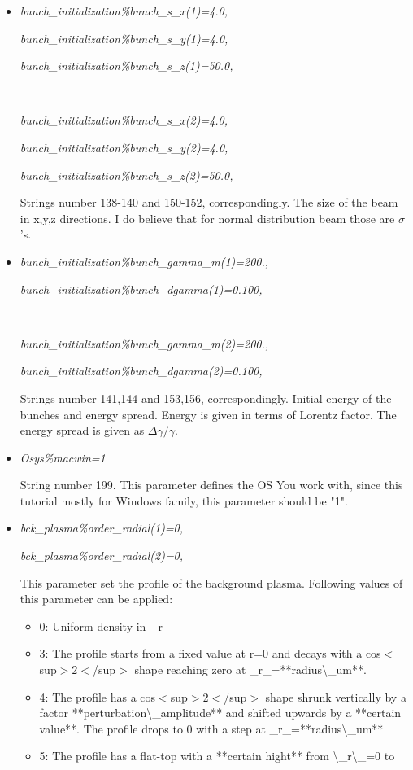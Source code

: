 \documentclass[12pt,a4paper]{article}
\begin{document}
\begin{itemize}
\item{\textit{bunch\_initialization\%bunch\_s\_x(1)=4.0,}

\textit{bunch\_initialization\%bunch\_s\_y(1)=4.0,}

\textit{bunch\_initialization\%bunch\_s\_z(1)=50.0,}

\

\textit{bunch\_initialization\%bunch\_s\_x(2)=4.0,}

\textit{bunch\_initialization\%bunch\_s\_y(2)=4.0,}

\textit{bunch\_initialization\%bunch\_s\_z(2)=50.0,} 

Strings number 138-140 and 150-152, correspondingly. The size of the beam in x,y,z directions. I do believe that for normal distribution beam those are $\sigma$'s.}

\item{\textit{bunch\_initialization\%bunch\_gamma\_m(1)=200.,}

\textit{bunch\_initialization\%bunch\_dgamma(1)=0.100,}

\

\textit{bunch\_initialization\%bunch\_gamma\_m(2)=200.,}

\textit{bunch\_initialization\%bunch\_dgamma(2)=0.100,}

Strings number 141,144 and 153,156, correspondingly. Initial energy of the bunches and energy spread. Energy is given in terms of Lorentz factor. The energy spread is given as $\Delta\gamma/\gamma$.}

\item{\textit{Osys\%macwin=1} 

String number 199. This parameter defines the OS You work with, since this tutorial mostly for Windows family, this parameter should be "1".}

\item{\textit{bck\_plasma\%order\_radial(1)=0,}

\textit{bck\_plasma\%order\_radial(2)=0,}

This parameter set the profile of the background plasma. Following values of this parameter can be applied:

	\begin{itemize}
	\item{0: Uniform density in \_r\_}
	\item{3: The profile starts from a fixed value at r=0 and decays with a cos$<$sup$>$2$<$/sup$>$ shape reaching zero  at \_r\_=**radius\textbackslash\_um**.}
	\item{4: The profile has a cos$<$sup$>$2$<$/sup$>$ shape shrunk vertically by a factor **perturbation\textbackslash\_amplitude** and shifted upwards by a **certain value**. The 	profile drops to 0 with a step at \_r\_=**radius\textbackslash\_um**}
	\item{5: The profile has a flat-top with a **certain hight** from \textbackslash\_r\textbackslash\_=0 to 

}
\end{itemize}}
\end{itemize}
\end{document}
